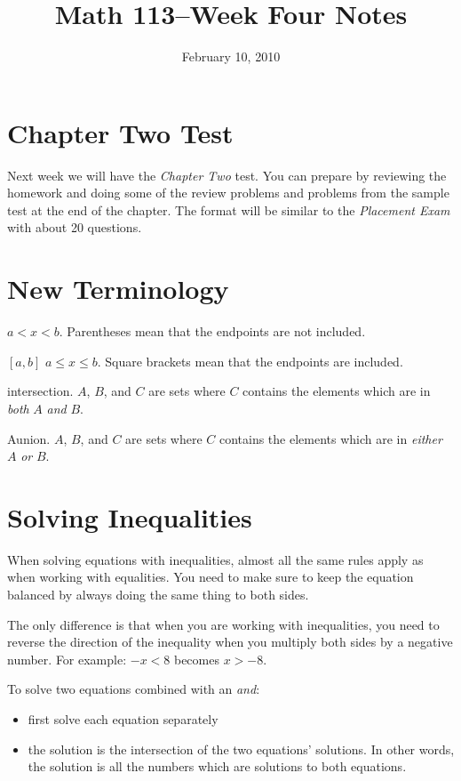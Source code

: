 \documentclass[fleqn]{article}
\title{Math 113--Week Four Notes}
\author{}
\date{February 10, 2010}
\begin{document}
\maketitle

\section{Chapter Two Test}

Next week we will have the {\em Chapter Two} test.  You can prepare by reviewing the homework and doing some of the review
problems and problems from the sample test at the end of the chapter.  The format will be
similar to the {\em Placement Exam} with about 20 questions. 

\section{New Terminology}

\begin{description}
  \item[$(a, b)$] \(a < x < b\).  Parentheses mean that the endpoints are not included.
  \item{$[a, b]$} \(a \leq x \leq b\).  Square brackets mean that the endpoints are included.
  \item[\(C = A \cap B\)] intersection.  $A$, $B$, and $C$ are sets where $C$ contains the elements which are in {\em both} $A$ {\em and} $B$.
  \item[\(C = A \cup B\)] Aunion.  $A$, $B$, and $C$ are sets where $C$ contains the elements which are in {\em either} $A$
    {\em or} $B$.
\end{description}

\section{Solving Inequalities}

When solving equations with inequalities, almost all the same rules apply as when working with equalities.  You need to
make sure to keep the equation balanced by always doing the same thing to both sides.  

The only difference is that when you are working with inequalities, you need to reverse the direction of the inequality
when you multiply both sides by a negative number. For example: \( -x < 8 \) becomes \( x > -8 \).

To solve two equations combined with an {\em and}:
\begin{itemize}
  \item first solve each equation separately
  \item the solution is the intersection of the two equations' solutions.  In other words, the solution is all the numbers which are
    solutions to both equations.
\end{itemize}
\end{document}
